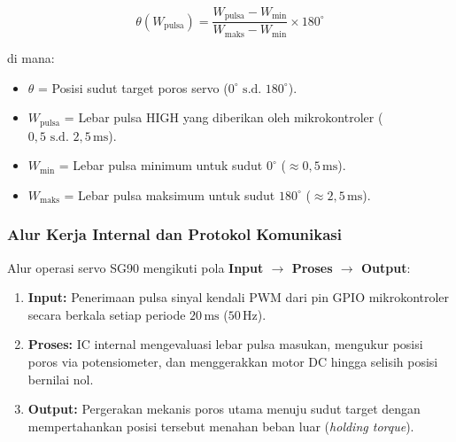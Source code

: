 \begin{equation}
	\theta(W_{\text{pulsa}}) = \frac{W_{\text{pulsa}} - W_{\text{min}}}{W_{\text{maks}} - W_{\text{min}}} \times 180^\circ
	\label{eq:sg90_konversi_sudut}
\end{equation}

\noindent di mana:
\begin{itemize}
	\item $\theta$ = Posisi sudut target poros servo ($0^\circ \text{ s.d. } 180^\circ$).
	\item $W_{\text{pulsa}}$ = Lebar pulsa HIGH yang diberikan oleh mikrokontroler ($0{,}5 \text{ s.d. } 2{,}5\,\text{ms}$).
	\item $W_{\text{min}}$ = Lebar pulsa minimum untuk sudut $0^\circ$ ($\approx 0{,}5\,\text{ms}$).
	\item $W_{\text{maks}}$ = Lebar pulsa maksimum untuk sudut $180^\circ$ ($\approx 2{,}5\,\text{ms}$).
\end{itemize}

\subsubsection{Alur Kerja Internal dan Protokol Komunikasi}
Alur operasi servo SG90 mengikuti pola \textbf{Input $\rightarrow$ Proses $\rightarrow$ Output}:
\begin{enumerate}
	\item \textbf{Input:} Penerimaan pulsa sinyal kendali PWM dari pin GPIO mikrokontroler secara berkala setiap periode $20\,\text{ms}$ ($50\,\text{Hz}$).
	\item \textbf{Proses:} IC internal mengevaluasi lebar pulsa masukan, mengukur posisi poros via potensiometer, dan menggerakkan motor DC hingga selisih posisi bernilai nol.
	\item \textbf{Output:} Pergerakan mekanis poros utama menuju sudut target dengan mempertahankan posisi tersebut menahan beban luar (\textit{holding torque}).
\end{enumerate}

